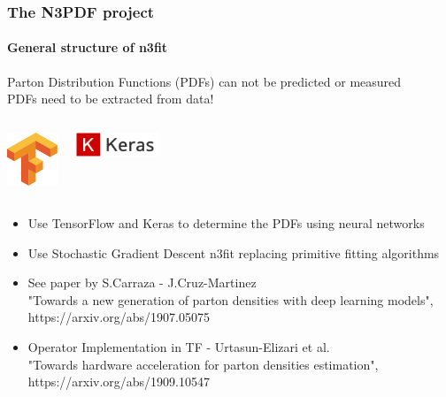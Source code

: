 \documentclass[aspectratio=43]{beamer}
\begin{document}
\begin{frame}
	
	\frametitle{The N3PDF project}
	\framesubtitle{General structure of n3fit}

	\footnotesize Parton Distribution Functions (PDFs) can not be predicted or measured\\
	{\color{red} PDFs need to be extracted from data!}

	\vspace{0.5cm}
	
	\begin{columns}
		
		
		\includegraphics[width = 1.5cm]{plots/section2/TF.png}
				
				
		\includegraphics[width = 2.5cm]{plots/section2/Keras.png}
		
	\end{columns}
	
	\vspace{0.5cm}
	
	\begin{itemize}
		\item \footnotesize Use TensorFlow and Keras to determine the PDFs using neural networks
		\item \footnotesize Use Stochastic Gradient Descent {\color{violet} n3fit} replacing primitive fitting algorithms
	    \item \footnotesize See paper by S.Carraza - J.Cruz-Martinez \\
		\footnotesize {\color{blue}"Towards a new generation of parton densities with deep learning models",\\ https://arxiv.org/abs/1907.05075}
		\item Operator Implementation in TF - Urtasun-Elizari et al.\\
		{\color{blue}"Towards hardware acceleration for parton densities estimation",\\ https://arxiv.org/abs/1909.10547}
	\end{itemize}

\end{frame}
\end{document}
